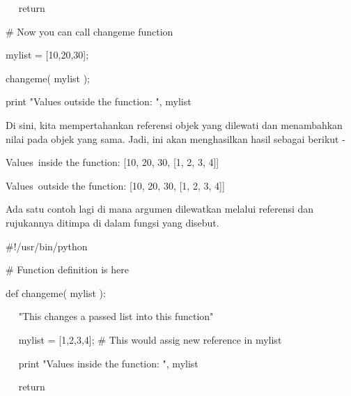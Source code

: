 \noindent 
~~  \hspace*{0.5in} return \par
\noindent 
 \hspace*{0.5in} \vspace{12pt}
\noindent 
 \hspace*{0.5in}  $  \#  $ Now you can call changeme function \par
\noindent 
 \hspace*{0.5in} mylist = [10,20,30]; \par
\noindent 
 \hspace*{0.5in} changeme( mylist ); \par
\noindent 
 \hspace*{0.5in} print "Values outside the function: ", mylist \par
\noindent 
Di sini, kita mempertahankan referensi objek yang dilewati dan menambahkan nilai pada objek yang sama. Jadi, ini akan menghasilkan hasil sebagai berikut - \par
\noindent 
 \hspace*{0.5in} Values~inside the function:  [10, 20, 30, [1, 2, 3, 4]] \par
\noindent 
 \hspace*{0.5in} Values~outside the function:  [10, 20, 30, [1, 2, 3, 4]] \par
\noindent 
Ada satu contoh lagi di mana argumen dilewatkan melalui referensi dan rujukannya ditimpa di dalam fungsi yang disebut. \par
\noindent 
 \hspace*{0.5in}  $  \#  $!/usr/bin/python \par
\vspace{12pt}
\noindent 
 \hspace*{0.5in}  $  \#  $ Function definition is here \par
\noindent 
 \hspace*{0.5in} def changeme( mylist ): \par
\noindent 
 \hspace*{0.5in} ~~ "This changes a passed list into this function" \par
\noindent 
 \hspace*{0.5in} ~~ mylist = [1,2,3,4];  $  \#  $ This would assig new reference in mylist \par
\noindent 
 \hspace*{0.5in} ~~ print "Values inside the function: ", mylist \par
\noindent 
 \hspace*{0.5in} ~~ return \par
